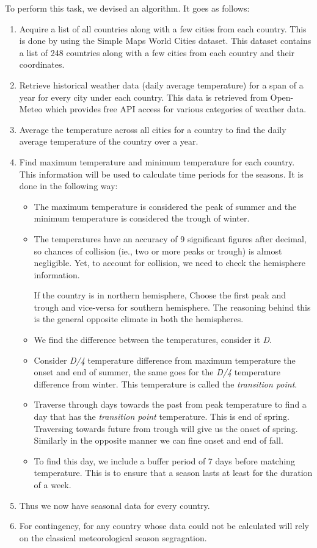 To perform this task, we devised an algorithm. It goes as follows:
\begin{enumerate}
    \item Acquire a list of all countries along with a few cities from each country. This is done by using the Simple Maps World Cities dataset\cite{world_cities}. This dataset contains a list of 248 countries along with a few cities from each country and their coordinates.
    \item Retrieve historical weather data (daily average temperature) for a span of a year for every city under each country. This data is retrieved from Open-Meteo\cite{Zippenfenig_Open-Meteo} which provides free API access for various categories of weather data.
    \item Average the temperature across all cities for a country to find the daily average temperature of the country over a year.
    \item Find maximum temperature and minimum temperature for each country. This information will be used to calculate time periods for the seasons. It is done in the following way:
    \begin{itemize}
        \item The maximum temperature is considered the peak of summer and the minimum temperature is considered the trough of winter.
        \item The temperatures have an accuracy of 9 significant figures after decimal, so chances of collision (ie., two or more peaks or trough) is almost negligible. Yet, to account for collision, we need to check the hemisphere information.

        If the country is in northern hemisphere, Choose the first peak and trough and vice-versa for southern hemisphere. The reasoning behind this is the general opposite climate in both the hemispheres.
        \item We find the difference between the temperatures, consider it \textit{D}.
        \item Consider \textit{D/4} temperature difference from maximum temperature the onset and end of summer, the same goes for the \textit{D/4} temperature difference from winter. This temperature is called the \textit{transition point}.
        \item Traverse through days towards the past from peak temperature to find a day that has the \textit{transition point} temperature. This is end of spring. Traversing towards future from trough will give us the onset of spring. Similarly in the opposite manner we can fine onset and end of fall.
        \item To find this day, we include a buffer period of 7 days before matching temperature. This is to ensure that a season lasts at least for the duration of a week.
    \end{itemize}
    \item Thus we now have seasonal data for every country.
    \item For contingency, for any country whose data could not be calculated will rely on the classical meteorological season segragation.
\end{enumerate}

